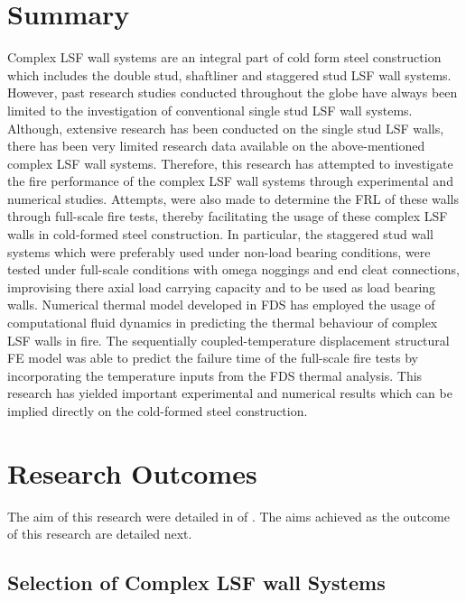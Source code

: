 \section{Summary}

Complex LSF wall systems are an integral part of cold form steel construction which includes the double stud, shaftliner and staggered stud LSF wall systems. However, past research studies conducted throughout the globe have always been limited to the investigation of conventional single stud LSF wall systems. Although, extensive research has been conducted on the single stud LSF walls, there has been very limited research data available on the above-mentioned complex LSF wall systems. Therefore, this research has attempted to investigate the fire performance of the complex LSF wall systems through experimental and numerical studies. Attempts, were also made to determine the FRL of these walls through full-scale fire tests, thereby facilitating the usage of these complex LSF walls in cold-formed steel construction. In particular, the staggered stud wall systems which were preferably used under non-load bearing conditions, were tested under full-scale conditions with omega noggings and end cleat connections, improvising there axial load carrying capacity and to be used as load bearing walls. Numerical thermal model developed in FDS has employed the usage of computational fluid dynamics in predicting the thermal behaviour of complex LSF walls in fire. The sequentially coupled-temperature displacement structural FE model was able to predict the failure time of the full-scale fire tests by incorporating the temperature inputs from the FDS thermal analysis. This research has yielded important experimental and numerical results which can be implied directly on the cold-formed steel construction.     

\section{Research Outcomes}

The aim of this research were detailed in  of . The aims achieved as the outcome of this research are detailed next.

\subsection{Selection of Complex LSF wall Systems}

